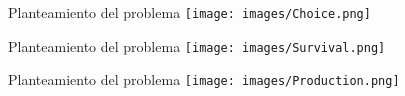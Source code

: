 \documentclass[aspectratio=169]{beamer}
\begin{document}
\begin{frame}{Planteamiento del problema}
	\vspace{-1.5cm} \centering
	\texttt{[image: images/Choice.png]}
\end{frame}

\begin{frame}{Planteamiento del problema}
	\vspace{-1cm}\centering
	\texttt{[image: images/Survival.png]}
\end{frame}

\begin{frame}{Planteamiento del problema}
	 \vspace{-1cm}
	 \centering
	\texttt{[image: images/Production.png]}
\end{frame}
\end{document}
